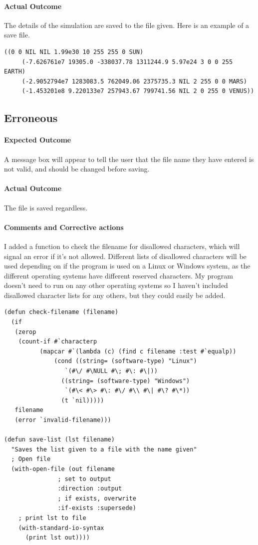 \paragraph{Actual Outcome}
The details of the simulation are saved to the file given. Here is an example of
a save file.
\begin{lstlisting}[numbers=none]
	((0 0 NIL NIL 1.99e30 10 255 255 0 SUN) 
	 (-7.626761e7 19305.0 -338037.78 1311244.9 5.97e24 3 0 0 255 EARTH) 
	 (-2.9052794e7 1283083.5 762049.06 2375735.3 NIL 2 255 0 0 MARS) 
	 (-1.453201e8 9.220133e7 257943.67 799741.56 NIL 2 0 255 0 VENUS)) 
\end{lstlisting}

\subsection{Erroneous}
\paragraph{Expected Outcome}
A message box will appear to tell the user that the file name they have entered
is not valid, and should be changed before saving.
\paragraph{Actual Outcome}
The file is saved regardless.
\paragraph{Comments and Corrective actions}
I added a function to check the filename for disallowed characters, which will
signal an error if it's not allowed. Different lists of disallowed characters
will be used depending on if the program is used on a Linux or Windows system,
as the different operating systems have different reserved characters. My
program doesn't need to run on any other operating systems so I haven't included
disallowed character lists for any others, but they could easily be added.
\begin{lstlisting}
(defun check-filename (filename)
  (if 
   (zerop
    (count-if #`characterp
	      (mapcar #`(lambda (c) (find c filename :test #`equalp))
		      (cond ((string= (software-type) "Linux")
			     `(#\/ #\NULL #\; #\: #\|))
			    ((string= (software-type) "Windows")
			     `(#\< #\> #\: #\/ #\\ #\| #\? #\*))
			    (t `nil)))))
   filename
   (error `invalid-filename)))

(defun save-list (lst filename)
  "Saves the list given to a file with the name given"
  ; Open file
  (with-open-file (out filename 
		       ; set to output
		       :direction :output 
		       ; if exists, overwrite
		       :if-exists :supersede) 
    ; print lst to file
    (with-standard-io-syntax
      (print lst out)))) 
\end{lstlisting}

